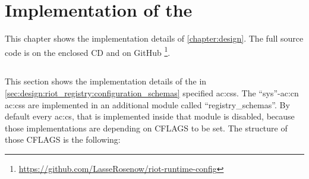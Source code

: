 \chapter{Implementation of the }
\label{chapter:implementation}

This chapter shows the implementation details of \autoref{chapter:design}.
The full source code is on the enclosed CD and on GitHub \footnote{\url{https://github.com/LasseRosenow/riot-runtime-config}}.

\section{}

This section shows the implementation details of the in \autoref{sec:design:riot_registry:configuration_schemas} specified \glspl{ac:cs}.
The ``sys''-\gls{ac:cn} \glspl{ac:cs} are implemented in an additional module called ``registry\_schemas''.
By default every \gls{ac:cs}, that is implemented inside that module is disabled, because those implementations are depending on CFLAGS to be set.
The structure of those CFLAGS is the following:
